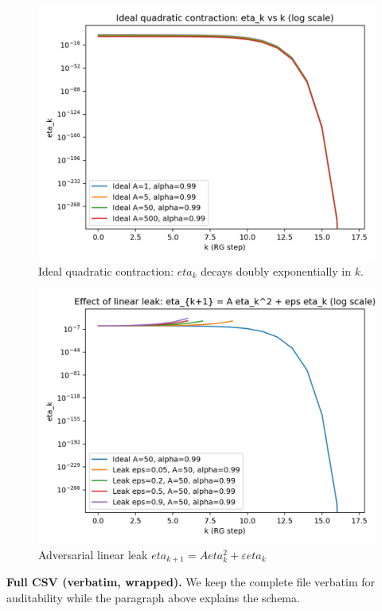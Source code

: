 \documentclass[11pt]{article}
\def\eta{eta}%
\theoremstyle{definition}
\theoremstyle{remark}
\newcommand{\1}{\mathbbm{1}}
\newcommand{\pdfmath}[2]{\texorpdfstring{#1}{#2}}
\begin{document}
\begin{figure}[p]
  \centering
  \includegraphics[width=.95\linewidth]{ideal_trajectories.png}
  \caption{Ideal quadratic contraction: $\eta_k$ decays doubly exponentially in $k$.}
\end{figure}

\begin{figure}[htbp]
  \centering
  \includegraphics[width=.85\linewidth]{leak_effect.png}
  \caption{\pdfmath{Adversarial linear leak $\eta_{k+1}=A\eta_k^2+\varepsilon\eta_k$}{Adversarial linear leak ruins contraction.}}
\end{figure}

\noindent\textbf{Full CSV (verbatim, wrapped).} We keep the complete file verbatim for auditability while the paragraph above explains the schema.
\end{document}
